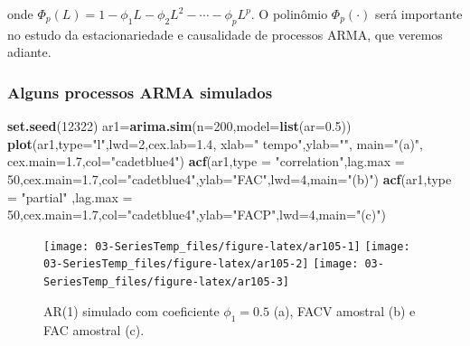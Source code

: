 \documentclass[
]{book}
\newenvironment{Shaded}{\begin{snugshade}}{\end{snugshade}}
\newcommand{\DataTypeTok}[1]{\textcolor[rgb]{0.13,0.29,0.53}{#1}}
\newcommand{\DecValTok}[1]{\textcolor[rgb]{0.00,0.00,0.81}{#1}}
\newcommand{\FloatTok}[1]{\textcolor[rgb]{0.00,0.00,0.81}{#1}}
\newcommand{\KeywordTok}[1]{\textcolor[rgb]{0.13,0.29,0.53}{\textbf{#1}}}
\newcommand{\NormalTok}[1]{#1}
\newcommand{\StringTok}[1]{\textcolor[rgb]{0.31,0.60,0.02}{#1}}
\theoremstyle{definition}
\theoremstyle{definition}
\theoremstyle{definition}
\theoremstyle{remark}
\begin{document}
onde \(\Phi_p(L)=1-\phi_1L-\phi_2L^ 2-\cdots-\phi_pL^p\). O polinômio \(\Phi_p(\cdot)\) será importante no estudo da estacionariedade e causalidade de processos ARMA, que veremos adiante.

\hypertarget{alguns-processos-arma-simulados}{%
\subsubsection{Alguns processos ARMA simulados}\label{alguns-processos-arma-simulados}}

\begin{Shaded}
\begin{Highlighting}[]
\KeywordTok{set.seed}\NormalTok{(}\DecValTok{12322}\NormalTok{)}
\NormalTok{ar1=}\KeywordTok{arima.sim}\NormalTok{(}\DataTypeTok{n=}\DecValTok{200}\NormalTok{,}\DataTypeTok{model=}\KeywordTok{list}\NormalTok{(}\DataTypeTok{ar=}\FloatTok{0.5}\NormalTok{))}
\KeywordTok{plot}\NormalTok{(ar1,}\DataTypeTok{type=}\StringTok{"l"}\NormalTok{,}\DataTypeTok{lwd=}\DecValTok{2}\NormalTok{,}\DataTypeTok{cex.lab=}\FloatTok{1.4}\NormalTok{, }\DataTypeTok{xlab=}\StringTok{" tempo"}\NormalTok{,}\DataTypeTok{ylab=}\StringTok{""}\NormalTok{, }\DataTypeTok{main=}\StringTok{"(a)"}\NormalTok{, }\DataTypeTok{cex.main=}\FloatTok{1.7}\NormalTok{,}\DataTypeTok{col=}\StringTok{"cadetblue4"}\NormalTok{)}
\KeywordTok{acf}\NormalTok{(ar1,}\DataTypeTok{type =} \StringTok{"correlation"}\NormalTok{,}\DataTypeTok{lag.max =} \DecValTok{50}\NormalTok{,}\DataTypeTok{cex.main=}\FloatTok{1.7}\NormalTok{,}\DataTypeTok{col=}\StringTok{"cadetblue4"}\NormalTok{,}\DataTypeTok{ylab=}\StringTok{"FAC"}\NormalTok{,}\DataTypeTok{lwd=}\DecValTok{4}\NormalTok{,}\DataTypeTok{main=}\StringTok{"(b)"}\NormalTok{)}
\KeywordTok{acf}\NormalTok{(ar1,}\DataTypeTok{type =} \StringTok{"partial"}\NormalTok{ ,}\DataTypeTok{lag.max =} \DecValTok{50}\NormalTok{,}\DataTypeTok{cex.main=}\FloatTok{1.7}\NormalTok{,}\DataTypeTok{col=}\StringTok{"cadetblue4"}\NormalTok{,}\DataTypeTok{ylab=}\StringTok{"FACP"}\NormalTok{,}\DataTypeTok{lwd=}\DecValTok{4}\NormalTok{,}\DataTypeTok{main=}\StringTok{"(c)"}\NormalTok{)}
\end{Highlighting}
\end{Shaded}

\begin{figure}
\texttt{[image: 03-SeriesTemp\_files/figure-latex/ar105-1]} \texttt{[image: 03-SeriesTemp\_files/figure-latex/ar105-2]} \texttt{[image: 03-SeriesTemp\_files/figure-latex/ar105-3]} \caption{AR(1) simulado com coeficiente $\phi_1=0.5$ (a), FACV amostral (b) e FAC amostral (c).}\label{fig:ar105}
\end{figure}
\end{document}
